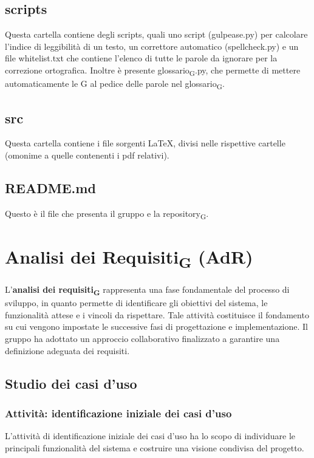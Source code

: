 \documentclass[11pt,a4paper]{article}
\newcommand{\gls}[1]{#1\textsubscript{G}}
\begin{document}
\subsection{scripts}
Questa cartella contiene degli scripts, quali uno script (gulpease.py) per calcolare l'indice di leggibilità di un testo, un correttore automatico (spellcheck.py) e un file whitelist.txt che contiene l'elenco di tutte le parole da ignorare per la correzione ortografica. Inoltre è presente \gls{glossario}.py, che permette di mettere automaticamente le G al pedice delle parole nel \gls{glossario}.
\subsection{src}
Questa cartella contiene i file sorgenti LaTeX, divisi nelle rispettive cartelle (omonime a quelle contenenti i pdf relativi).

\subsection{README.md}
Questo è il file che presenta il gruppo e la \gls{repository}.

\newpage

\section{\gls{Analisi dei Requisiti} (AdR)}
L’\textbf{\gls{analisi dei requisiti}} rappresenta una fase fondamentale del processo di sviluppo, in quanto permette di identificare gli obiettivi del sistema, le funzionalità attese e i vincoli da rispettare. Tale attività costituisce il fondamento su cui vengono impostate le successive fasi di progettazione e implementazione. 
Il gruppo ha adottato un approccio collaborativo finalizzato a garantire una definizione adeguata dei requisiti.

\subsection{Studio dei casi d'uso}

\subsubsection{Attività: identificazione iniziale dei casi d'uso}
L’attività di identificazione iniziale dei casi d’uso ha lo scopo di individuare le principali funzionalità del sistema e costruire una visione condivisa del progetto.
\end{document}
